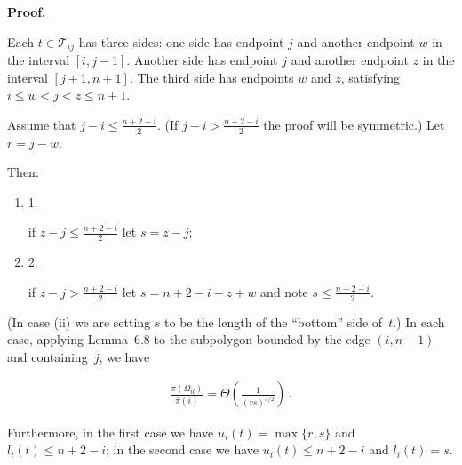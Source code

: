 


\par\medskip\noindent\textbf{Proof.}\par



Each $t\in\mathcal{T}_{ij}$ has three sides: one side has endpoint $j$ and another endpoint $w$ in the interval $[i,j-1]$. Another side has endpoint $j$ and another endpoint $z$ in the interval $[j+1,n+1]$. The third side has endpoints $w$ and $z$, satisfying $i\leq w<j<z\leq n+1$.\par




Assume that $j-i\leq\frac{n+2-i}{2}$. (If $j-i>\frac{n+2-i}{2}$ the proof will be symmetric.) Let $r=j-w$.\par




Then:\par


\begin{enumerate}


\item[] 1. 


if $z-j\leq\frac{n+2-i}{2}$ let $s=z-j$;\par




\item[] 2. 


if $z-j>\frac{n+2-i}{2}$ let $s=n+2-i-z+w$ and note $s\leq\frac{n+2-i}{2}$.\par




\end{enumerate}


(In case (ii) we are setting $s$ to be the length of the “bottom” side of $t$.)
In each case, applying Lemma 6.8 to the subpolygon bounded by the edge $(i,n+1)$ and containing $j$, we have\par




\[\begin{gathered}
\frac{\pi(\Omega_{it})}{\hat{\pi}(i)}=\Theta\left(\frac{1}{(rs)^{3/2}}\right)\,.
\end{gathered}\]




Furthermore, in the first case we have $u_{i}(t)=\max\{r,s\}$ and $l_{i}(t)\leq n+2-i$; in the second case we have $u_{i}(t)\leq n+2-i$ and $l_{i}(t)=s$.\par




